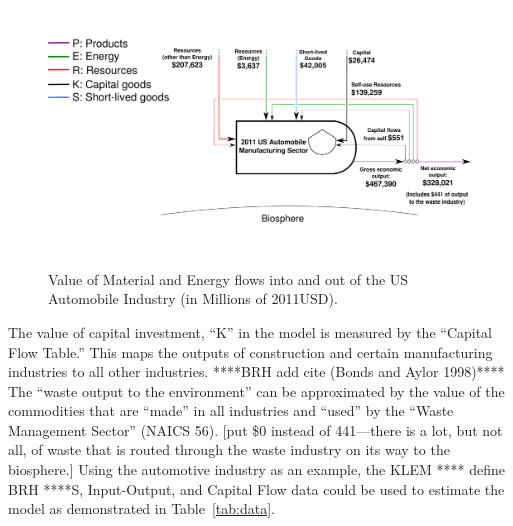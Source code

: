\begin{figure}[!ht]
\centering
\includegraphics[width=1.0\linewidth]{Part_2/Chapter_Values/images/PERKS_basic_unit_value_auto_ind.pdf}
\caption[Value of Material and Energy flows into and out of the US Automobile Industry]{Value of Material and Energy flows into and out of the US Automobile Industry (in Millions of 2011USD).}
\label{fig:PERKS_value_auto_ind}
\end{figure}

The value of capital investment, “K” in the model is measured  by the ``Capital Flow Table.'' 
This maps the outputs of construction and certain manufacturing industries to all other industries.
****BRH add cite (Bonds and Aylor 1998)****  The ``waste output to the environment''
can be approximated by the value of the commodities that are ``made'' in all industries 
and ``used'' by the ``Waste Management Sector'' (NAICS 56). 
[put \$0 instead of 441---there is a lot, but not all, of waste that 
is routed through the waste industry on its way to the biosphere.]
Using the automotive industry as an example, the KLEM **** define BRH ****S, Input-Output, 
and Capital Flow data could be used to estimate the model as demonstrated in Table~\ref{tab:data}.


